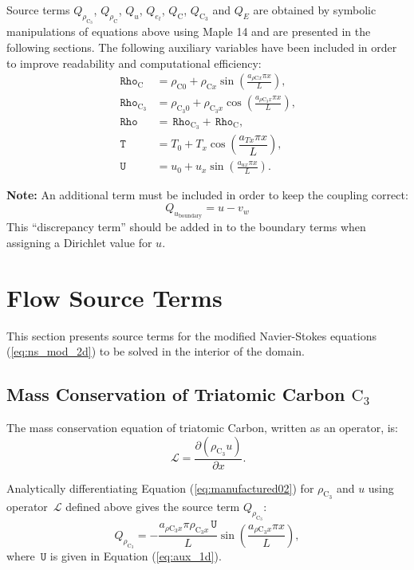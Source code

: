 \documentclass[10pt]{article}
\newcommand{\Diff}[2] {\dfrac{\partial( #1)}{\partial #2}}
\newcommand{\Lo}{\,\mathcal{L}}
\newcommand{\Rho}{\,\mathtt{Rho}}
\newcommand{\T}{\,\mathtt{T}}
\newcommand{\U}{\,\mathtt{U}}
\newcommand{\C}{\text{C}}
\begin{document}
Source terms $Q_{\rho_{\C_3}}$, $Q_{\rho_{\C}}$, $Q_u$, $Q_{e_t}$, $ Q_{\C}$, $ Q_{\C_{3}}$ and $Q_E$ are obtained by symbolic manipulations of equations above using Maple 14 \citep{Maple} and are presented in the following sections. The following auxiliary variables have been included in order to improve readability and computational efficiency:
\begin{equation}
 \begin{split}
\label{eq:aux_1d}
\Rho_{\C} &= \rho_{\C0} + \rho_{\C x} \sin\left(\frac{a_{  \rho \C x }\pi x}{L}\right),\\
\Rho_{\C_3} &= \rho_{\C_3 0}+ \rho_{\C_3 x} \cos\left(\frac{a_{ \rho \C_3 x } \pi x}{L}\right),\\
\Rho &=\Rho_{\C_3}+\Rho_{\C},\\
\T&= T_0+T_x \cos\left(\dfrac{a_{Tx} \pi x}{L}\right),\\
\U &= u_{0}+u_{x} \sin\left(\frac{a_{u x} \pi x}{L}\right).
 \end{split}
\end{equation}


\textbf{Note: } An additional term must be included in order to keep the coupling correct:
\begin{equation}
 Q_{u_\text{boundary}} = u - v_w
\end{equation}
This ``discrepancy term'' should be added in to the boundary terms when assigning a Dirichlet value for $u$.

\section{Flow Source Terms}

This section presents source terms for the modified Navier-Stokes equations  (\ref{eq:ns_mod_2d}) to be solved in the interior of the domain.


\subsection{Mass Conservation of Triatomic Carbon $\C_3$}

The mass conservation equation of triatomic Carbon, written as an operator, is:
\begin{equation*}
 \Lo= \Diff{\rho_{\C_3} u}{x}.
\end{equation*}

Analytically differentiating Equation (\ref{eq:manufactured02}) for $\rho_{\C_3}$ and $u$  using operator $\Lo$ defined above gives  the source term $Q_{\rho_{\C_3}}$:
\begin{equation}
Q_{\rho_{\C_3}} = -\dfrac{a_{ \rho \C_3 x } \pi \rho_{\C_3 x} \U }{L} \sin\left(\dfrac{a_{ \rho \C_3 x } \pi x}{L}\right),
\end{equation}
where $\U$ is given in Equation (\ref{eq:aux_1d}).
\end{document}
